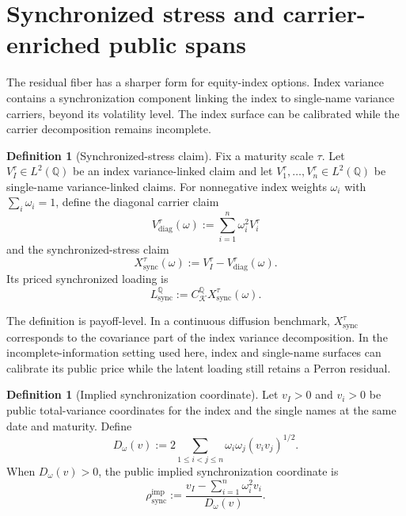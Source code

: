 \documentclass[11pt,a4paper]{amsart}
\theoremstyle{plain}
\theoremstyle{definition}
\newtheorem{definition}[theorem]{Definition}
\theoremstyle{remark}
\newcommand{\QQ}{\mathbb{Q}}
\newcommand{\cK}{\mathcal{K}}
\begin{document}
\section{Synchronized stress and carrier-enriched public spans}\label{sec:sync-carrier}

The residual fiber has a sharper form for equity-index options.  Index variance contains a
synchronization component linking the index to single-name variance carriers, beyond its volatility
level.  The index surface can be calibrated while the carrier decomposition remains incomplete.

\begin{definition}[Synchronized-stress claim]\label{def:synchronized-stress-claim}
Fix a maturity scale \(\tau\).  Let \(V_I^\tau\in L^2(\QQ)\) be an index variance-linked claim and
let \(V_1^\tau,\ldots,V_n^\tau\in L^2(\QQ)\) be single-name variance-linked claims.  For nonnegative
index weights \(\omega_i\) with \(\sum_i\omega_i=1\), define the diagonal carrier claim
\[
        V_{\mathrm{diag}}^\tau(\omega)
        :=
        \sum_{i=1}^n \omega_i^2 V_i^\tau
\]
and the synchronized-stress claim
\[
        X_{\mathrm{sync}}^\tau(\omega)
        :=
        V_I^\tau
        -
        V_{\mathrm{diag}}^\tau(\omega).
\]
Its priced synchronized loading is
\[
        L_{\mathrm{sync}}^\QQ
        :=
        C_{\cK}^{\QQ}X_{\mathrm{sync}}^\tau(\omega).
\]
\end{definition}

The definition is payoff-level.  In a continuous diffusion benchmark,
\(X_{\mathrm{sync}}^\tau\) corresponds to the covariance part of the index variance decomposition.
In the incomplete-information setting used here, index and single-name surfaces can calibrate its
public price while the latent loading still retains a Perron residual.

\begin{definition}[Implied synchronization coordinate]\label{def:implied-sync-coordinate}
Let \(v_I>0\) and \(v_i>0\) be public total-variance coordinates for the index and the single names
at the same date and maturity.  Define
\[
        D_\omega(v)
        :=
        2\sum_{1\le i<j\le n}
        \omega_i\omega_j (v_i v_j)^{1/2}.
\]
When \(D_\omega(v)>0\), the public implied synchronization coordinate is
\[
        \rho_{\mathrm{sync}}^{\mathrm{imp}}
        :=
        \frac{
        v_I-\sum_{i=1}^n \omega_i^2 v_i
        }{
        D_\omega(v)
        }.
\]
\end{definition}
\end{document}
